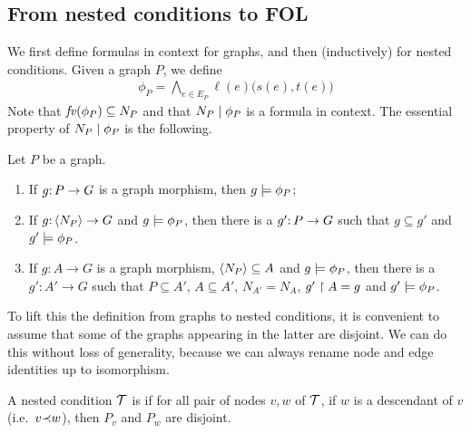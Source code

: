 \subsection{From nested conditions to FOL}

We first define formulas in context for graphs, and then (inductively) for nested conditions. Given a graph $P$, we define
\begin{align}
	\phi_P = \textstyle
 \bigwedge_{e\in E_P} \ell(e)\bigl(s(e),t(e)\bigr)\label{eq:phiP}
\end{align}
%
Note that $\mathit{fv}(\phi_P)\subseteq N_P$ and that ${N_P} \mid {\phi_P}$ is a formula in context. The essential property of ${N_P} \mid {\phi_P}$ is the following.
%
\begin{proposition}\label{prop:graph formula}
Let $P$ be a graph.
\begin{enumerate}
\item If $g{:}\, P\rightarrow G$ is a graph morphism, then $g\models \phi_P$;
\item If $g{:}\, \langle N_P\rangle\rightarrow G$ and $g\models \phi_P$, then there is a $g'{:}\, P\rightarrow G$ such that $g\subseteq g'$ and $g' \models \phi_P$.
\item If $g:A\to G$ is a graph morphism, $\langle N_P\rangle \subseteq A$ and $g\models \phi_P$, then there is a $g': A' \to G$ such that $P \subseteq A'$, $A \subseteq A'$, $N_{A'} = N_A$, $g' \restriction A = g$ and $g' \models \phi_P$. 
\end{enumerate}
\end{proposition}
%

To lift this the definition from graphs to nested conditions, it is convenient to assume that some of the graphs appearing in the latter are disjoint. We can do this without loss of generality, because we can always rename node and edge identities up to isomorphism.

\begin{definition}
	A nested condition ${\mathcal{T}}$ is \emph{\proper} if for all pair of nodes $v, w$ of ${\mathcal{T}}$, if $w$ is a descendant of $v$ (i.e.\ $v {\prec} w$), then $P_v$ and $P_w$ 
	are disjoint. 
\end{definition}


